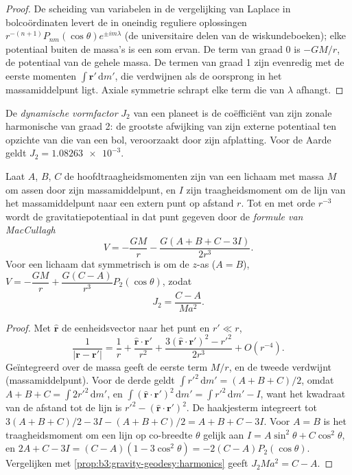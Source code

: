 \begin{proof}
De scheiding van variabelen in de vergelijking van Laplace in bolcoördinaten
levert de in oneindig reguliere oplossingen $r^{-(n+1)}P_{nm}(\cos\theta)e^{\pm
im\lambda}$ (de universitaire delen van de wiskundeboeken); elke potentiaal buiten
de massa's is een som ervan. De term van graad 0 is $-GM/r$, de potentiaal van
de gehele massa. De termen van graad 1 zijn evenredig met de eerste momenten
$\int\mathbf r'\,\mathrm dm'$, die verdwijnen als de oorsprong in het
massamiddelpunt ligt. Axiale symmetrie schrapt elke term die van $\lambda$ afhangt.
\end{proof}

\begin{definition}\label{def:b3:gravity-geodesy:j2}
De \emph{dynamische vormfactor} $J_2$ van een planeet
is de coëfficiënt van zijn zonale harmonische van graad 2: de grootste afwijking van
zijn externe potentiaal ten opzichte van die van een bol, veroorzaakt door zijn afplatting. Voor de
Aarde geldt $J_2 = \num{1.08263e-3}$.
\end{definition}

\begin{theorem}\label{thm:b3:gravity-geodesy:maccullagh}
Laat $A$, $B$, $C$ de hoofdtraagheidsmomenten zijn van een lichaam met massa $M$
om assen door zijn massamiddelpunt, en $I$ zijn traagheidsmoment om de
lijn van het massamiddelpunt naar een extern punt op afstand $r$. Tot en met
orde $r^{-3}$ wordt de gravitatiepotentiaal in dat punt gegeven door de
\emph{formule van MacCullagh}
\[
  V = -\frac{GM}{r} - \frac{G(A + B + C - 3I)}{2r^3} .
\]
Voor een lichaam dat symmetrisch is om de $z$-as ($A = B$),
$V = -\dfrac{GM}{r} + \dfrac{G(C - A)}{r^3}P_2(\cos\theta)$, zodat
\[
  J_2 = \frac{C - A}{Ma^2} .
\]
\end{theorem}

\begin{proof}
Met $\hat{\mathbf r}$ de eenheidsvector naar het punt en $r' \ll r$,
\[
  \frac{1}{|\mathbf r - \mathbf r'|} = \frac1r + \frac{\hat{\mathbf r}\cdot\mathbf r'}{r^2}
  + \frac{3(\hat{\mathbf r}\cdot\mathbf r')^2 - r'^2}{2r^3} + O(r^{-4}).
\]
Geïntegreerd over de massa geeft de eerste term $M/r$, en de tweede verdwijnt
(massamiddelpunt). Voor de derde geldt $\int r'^2\,\mathrm dm' = (A + B + C)/2$, omdat
$A + B + C = \int 2r'^2\,\mathrm dm'$, en $\int(\hat{\mathbf r}\cdot\mathbf
r')^2\,\mathrm dm' = \int r'^2\,\mathrm dm' - I$, want het kwadraat van de afstand tot
de lijn is $r'^2 - (\hat{\mathbf r}\cdot\mathbf r')^2$. De haakjesterm integreert
tot $3(A + B + C)/2 - 3I - (A + B + C)/2 = A + B + C - 3I$. Voor $A = B$ is het
traagheidsmoment om een lijn op co-breedte $\theta$ gelijk aan $I = A\sin^2\theta + C\cos^2\theta$,
en $2A + C - 3I = (C - A)(1 - 3\cos^2\theta) = -2(C - A)P_2(\cos\theta)$.
Vergelijken met \cref{prop:b3:gravity-geodesy:harmonics} geeft
$J_2Ma^2 = C - A$.
\end{proof}

